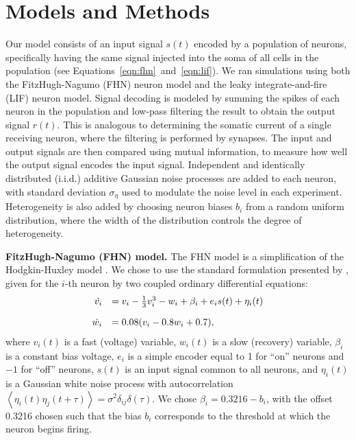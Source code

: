 \documentclass[12pt]{article}
\begin{document}
\section{Models and Methods}
\label{scn:methods}

Our model consists of an input signal $s(t)$ encoded by a population of neurons, specifically having the same signal injected into the soma of all cells in the population (see Equations~\ref{eqn:fhn}~and~\ref{eqn:lif}). We ran simulations using both the FitzHugh-Nagumo (FHN) neuron model and the leaky integrate-and-fire (LIF) neuron model. Signal decoding is modeled by summing the spikes of each neuron in the population and low-pass filtering the result to obtain the output signal $r(t)$. This is analogous to determining the somatic current of a single receiving neuron, where the filtering is performed by synapses. The input and output signals are then compared using mutual information, to measure how well the output signal encodes the input signal. Independent and identically distributed (i.i.d.) additive Gaussian noise processes are added to each neuron, with standard deviation $\sigma_\eta$ used to modulate the noise level in each experiment. Heterogeneity is also added by choosing neuron biases $b_i$ from a random uniform distribution, where the width of the distribution controls the degree of heterogeneity.

\textbf{FitzHugh-Nagumo (FHN) model.} The FHN model is a simplification of the Hodgkin-Huxley model \citep{FitzHugh1961}. We chose to use the standard formulation presented by \cite{Izhikevich2006}, given for the $i$-th neuron by two coupled ordinary differential equations:
\begin{equation}
  \begin{array}{rl}
    \dot{v_i} & = v_i - \frac{1}{3}v_i^3 - w_i + \beta_i + e_i s(t) + \eta_i(t) \vspace{1em}\\
    \dot{w_i} & = 0.08(v_i - 0.8w_i + 0.7),
  \end{array}
  \label{eqn:fhn}
\end{equation}
where $v_i(t)$ is a fast (voltage) variable, $w_i(t)$ is a slow (recovery) variable, $\beta_i$ is a constant bias voltage, $e_i$ is a simple encoder equal to 1 for ``on'' neurons and $-1$ for ``off'' neurons, $s(t)$ is an input signal common to all neurons, and $\eta_i(t)$ is a Gaussian white noise process with autocorrelation $\left<\eta_i(t)\eta_j(t + \tau)\right> = \sigma^2 \delta_{ij}\delta(\tau)$. We chose $\beta_i = 0.3216 - b_i$, with the offset 0.3216 chosen such that the bias $b_i$ corresponds to the threshold at which the neuron begins firing.
\end{document}
